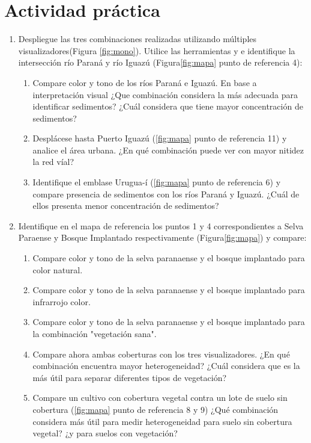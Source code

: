 \section{Actividad práctica}
\begin{enumerate}
  \item Despliegue las tres combinaciones realizadas utilizando múltiples visualizadores(Figura \ref{fig:mono}). Utilice las herramientas  y  e identifique la intersección río Paraná y río Iguazú (Figura\ref{fig:mapa} punto de referencia 4):
  \begin{enumerate}
  \item Compare color y tono de los ríos Paraná e Iguazú. En base a interpretación visual ¿Que combinación considera la más adecuada para identificar sedimentos? ¿Cuál  considera que tiene mayor concentración de sedimentos?
  \item  Desplácese hasta Puerto Iguazú (\ref{fig:mapa} punto de referencia 11) y analice el área urbana. ¿En qué combinación puede ver con mayor nitidez la red víal?
  \item  Identifique el emblase Urugua-í (\ref{fig:mapa} punto de referencia 6) y compare presencia de sedimentos con los ríos Paraná y Iguazú. ¿Cuál de ellos presenta menor concentración de sedimentos?
\end{enumerate}

  \item Identifique en el mapa de referencia los puntos 1 y 4 correspondientes a Selva Paraense y Bosque Implantado respectivamente (Figura\ref{fig:mapa}) y compare:
  \begin{enumerate}
    \item  Compare color y tono de la selva paranaense y el bosque implantado para color natural.
    \item  Compare color y tono de la selva paranaense y el bosque implantado para infrarrojo color.
    \item  Compare color y tono de la selva paranaense y el bosque implantado para la combinación "vegetación sana".
    \item Compare ahora ambas coberturas con los tres visualizadores. ¿En qué combinación encuentra mayor heterogeneidad? ¿Cuál considera que es la más útil para separar diferentes tipos de vegetación?
    \item Compare un cultivo con cobertura vegetal contra un lote de suelo sin cobertura (\ref{fig:mapa} punto de referencia 8 y 9) ¿Qué combinación considera más útil para medir heterogeneidad para suelo sin cobertura vegetal? ¿y para suelos con vegetación?
  \end{enumerate}


\end{enumerate}
